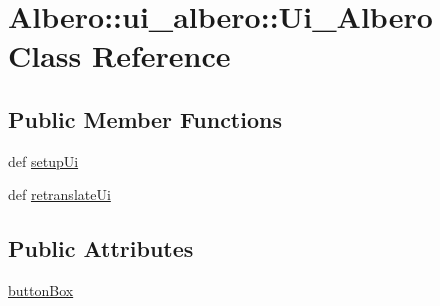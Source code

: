 \hypertarget{classAlbero_1_1ui__albero_1_1Ui__Albero}{
\section{Albero::ui\_\-albero::Ui\_\-Albero Class Reference}
\label{classAlbero_1_1ui__albero_1_1Ui__Albero}
}
\subsection*{Public Member Functions}
\begin{DoxyCompactItemize}
\item 
def \hyperlink{classAlbero_1_1ui__albero_1_1Ui__Albero_a177992a4b7ec50ecaa6132b3be06ea9b}{setupUi}
\item 
def \hyperlink{classAlbero_1_1ui__albero_1_1Ui__Albero_a83caeecf2cf071e4b6cbe3ee077475a6}{retranslateUi}
\end{DoxyCompactItemize}
\subsection*{Public Attributes}
\begin{DoxyCompactItemize}
\item 
\hyperlink{classAlbero_1_1ui__albero_1_1Ui__Albero_ae0a93e92645e036ab577947eb358321f}{buttonBox}
\end{DoxyCompactItemize}


